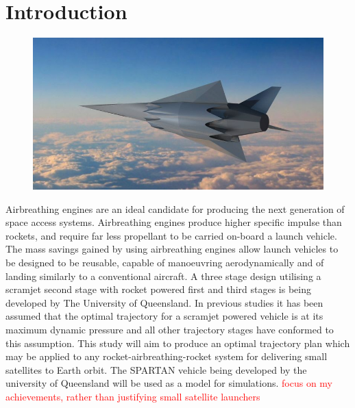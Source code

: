 
\cleardoublepage
\chapter{Introduction}


  	\begin{figure}
  		\centering
  		\includegraphics[width=0.7\linewidth]{figures/1_introduction/project-spartan}
  		\caption{}
  		\label{fig:project-spartan}
  	\end{figure}
  	
  	  Airbreathing engines are an ideal candidate for producing the next generation of space access
  	systems. Airbreathing engines produce higher specific impulse than rockets, and require far less propellant to be carried on-board a launch vehicle. 
  	 The mass savings gained by using airbreathing engines allow launch vehicles to be designed to be reusable, capable of manoeuvring aerodynamically and of landing similarly to a conventional aircraft. A three stage design utilising a scramjet
  	second stage with rocket powered first and third stages is being developed by The University of
  	Queensland. In previous studies it has been assumed that the optimal trajectory for a scramjet powered vehicle is at its
  	maximum dynamic pressure and all other trajectory stages have conformed to this assumption. This study will aim to produce an optimal
  	trajectory plan which may be applied to any rocket-airbreathing-rocket system for delivering small
  	satellites to Earth orbit. The SPARTAN vehicle being developed by the university of Queensland will
  	be used as a model for simulations.
  	\textcolor{red}{focus on my achievements, rather than justifying small satellite launchers}
  	
  
  
